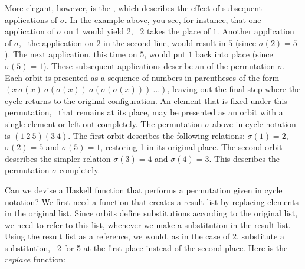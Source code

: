 \documentclass{scrreprt}
\begin{document}
More elegant, however, is the ,
which describes the effect of subsequent
applications of $\sigma$. 
In the example above, you see, for instance,
that one application of $\sigma$ on 1 would yield 2,
\ie\ $2$ takes the place of $1$.
Another application of $\sigma$,
\ie\ the application on $2$ in the second line,
would result in $5$ (since $\sigma(2) = 5$).
The next application, this time on $5$,
would put $1$ back into place (since $\sigma(5) = 1$).
These subsequent applications describe an 
of the permutation $\sigma$.
Each orbit is presented
as a sequence of numbers in parentheses of the form
$(x~\sigma(x)~\sigma(\sigma(x))~\sigma(\sigma(\sigma(x)))~\dots)$,
leaving out the final step 
where the cycle returns to the original configuration.
An element that is fixed under this permutation,
\ie\ that remains at its place,
may be presented as an orbit with a single element
or left out completely.
The permutation $\sigma$ above in cycle notation is
$(1~2~5)(3~4)$.
The first orbit describes the following relations:
$\sigma(1) = 2$, $\sigma(2) = 5$
and $\sigma(5) = 1$, restoring 1 in its original place.
The second orbit describes the simpler relation
$\sigma(3) = 4$ and $\sigma(4) = 3$.
This describes the permutation $\sigma$ 
completely.

Can we devise a Haskell function
that performs a permutation given in cycle notation?
We first need a function that 
creates a result list by replacing
elements in the original list.
Since orbits define substitutions
according to the original list,
we need to refer to this list,
whenever we make a substitution in the result list.
Using the result list as a reference,
we would, as in the case of 2,
substitute a substitution, 
\eg\ 2 for 5 at the first place
instead of the second place.
Here is the $replace$ function:
\end{document}

